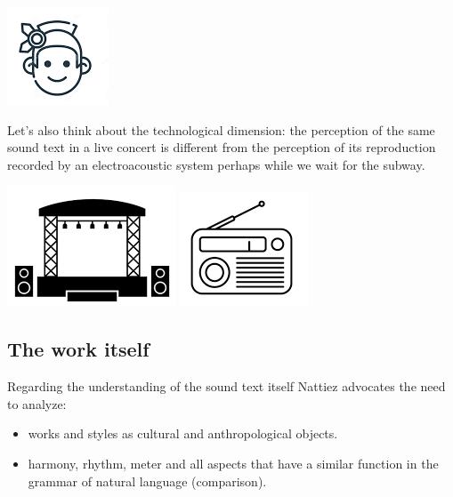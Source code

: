 \begin{center}
\includegraphics[scale=0.6]{../img/indigeni.png}
\end{center}

Let's also think about the technological dimension: the perception of the same sound text in a live concert is different from the perception of its reproduction recorded by an electroacoustic system perhaps while we wait for the subway.

\begin{center}
\includegraphics[scale=0.5]{../img/acousma.png}
\includegraphics[scale=0.5]{../img/sony.png}
\end{center}

\subsection{The work itself}\label{the-work-itself}

Regarding the understanding of the sound text itself Nattiez advocates the need to analyze: 

\begin{itemize}
\tightlist
\item works and styles as cultural and anthropological objects. 
\item harmony, rhythm, meter and all aspects that have a similar function in the grammar of natural language (comparison).
\end{itemize}

